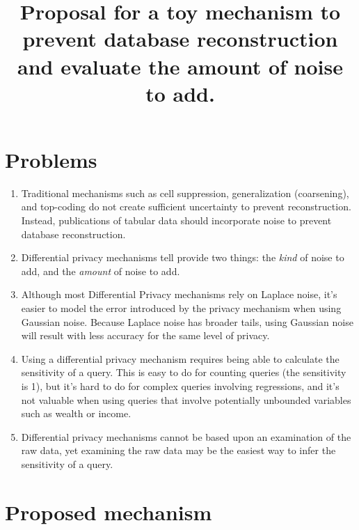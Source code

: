 \documentclass{article}
\begin{document}
\title{Proposal for a toy mechanism to prevent database reconstruction and
evaluate the amount of noise to add.}
\maketitle

\section{Problems}

\begin{enumerate}

\item Traditional mechanisms such as cell suppression, generalization
(coarsening), and top-coding do not create sufficient uncertainty to
prevent reconstruction. Instead, publications of tabular data should
incorporate noise to prevent database reconstruction.

\item Differential privacy mechanisms tell provide two things: the \emph{kind} of noise
to add, and the \emph{amount} of noise to add.

\item Although most Differential Privacy mechanisms rely on Laplace
noise, it's easier to model the error introduced by the privacy
mechanism when using Gaussian noise. Because Laplace noise has broader
tails, using Gaussian noise will result with less accuracy for the
same level of privacy.

\item Using a differential privacy mechanism requires being able to
calculate the sensitivity of a query. This is easy to do for counting
queries (the sensitivity is 1), but it's hard to do for complex
queries involving regressions, and it's not valuable when using
queries that involve potentially unbounded variables such as wealth or
income. 

\item Differential privacy mechanisms cannot be based upon an examination
of the raw data, yet examining the raw data may be the easiest way to
infer the sensitivity of a query.

\end{enumerate}

\section{Proposed mechanism}
\end{document}
